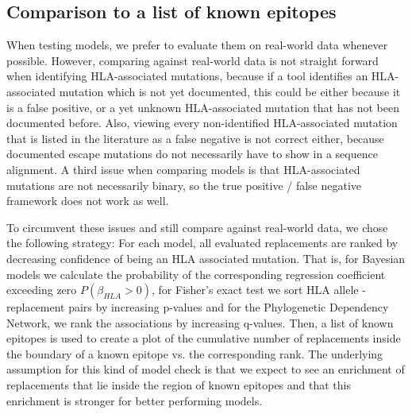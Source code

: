 \documentclass[fleqn,11pt]{SelfArx} %
\begin{document}
\subsection*{Comparison to a list of known epitopes}

When testing models, we prefer to evaluate them on real-world data whenever possible. 
However, comparing against real-world data is not straight forward when identifying HLA-associated mutations, because if a tool identifies an HLA-associated mutation which is not yet documented, this could be either because it is a false positive, or a yet unknown HLA-associated mutation that has not been documented before. 
Also, viewing every non-identified HLA-associated mutation that is listed in the literature as a false negative is not correct either, because documented escape mutations do not necessarily have to show in a sequence alignment.
A third issue when comparing models is that HLA-associated mutations are not necessarily binary, so the true positive / false negative framework does not work as well.

To circumvent these issues and still compare against real-world data, we chose the following strategy:
For each model, all evaluated replacements are ranked by decreasing confidence of being an HLA associated mutation. That is, for Bayesian models we calculate the probability of the corresponding regression coefficient exceeding zero \(P(\beta_{HLA} > 0)\), for Fisher's exact test we sort HLA allele - replacement pairs by increasing p-values and for the Phylogenetic Dependency Network, we rank the associations by increasing q-values.
Then, a list of known epitopes is used to create a plot of the cumulative number of replacements inside the boundary of a known epitope vs. the corresponding rank. The underlying assumption for this kind of model check is that we expect to see an enrichment of replacements that lie inside the region of known epitopes and that this enrichment is stronger for better performing models.
\end{document}
